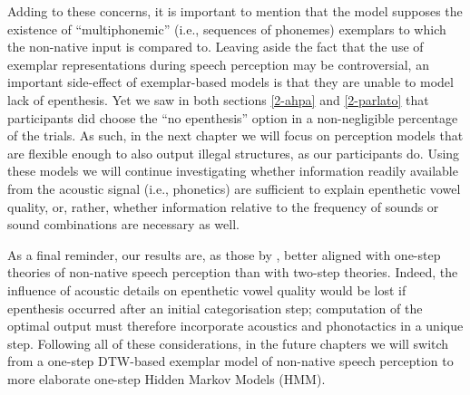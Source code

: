 Adding to these concerns, it is important to mention that the model supposes the existence of ``multiphonemic'' (i.e., sequences of phonemes) exemplars to which the non-native input is compared to. Leaving aside the fact that the use of exemplar representations during speech perception may be controversial, an important side-effect of exemplar-based models is that they are unable to model lack of epenthesis. Yet we saw in both sections \ref{2-ahpa} and \ref{2-parlato} that participants did choose the ``no epenthesis'' option in a non-negligible percentage of the trials. As such, in the next chapter we will focus on perception models that are flexible enough to also output illegal structures, as our participants do. Using these models we will continue investigating whether information readily available from the acoustic signal (i.e., phonetics) are sufficient to explain epenthetic vowel quality, or, rather, whether information relative to the frequency of sounds or sound combinations are necessary as well.  

As a final reminder, our results are, as those by \cite{dupoux2011}, better aligned with one-step theories of non-native speech perception than with two-step theories. Indeed, the influence of acoustic details on epenthetic vowel quality would be lost if epenthesis occurred after an initial categorisation step; computation of the optimal output must therefore incorporate acoustics and phonotactics in a unique step. Following all of these considerations, in the future chapters we will switch from a one-step DTW-based exemplar model of non-native speech perception to more elaborate one-step Hidden Markov Models (HMM).

